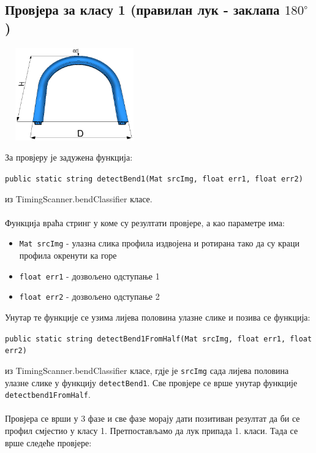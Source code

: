 \documentclass[12pt]{article}
\begin{document}
\subsection{Провјера за класу 1 (правилан лук - заклапа $180^\circ$)}
\vspace{0.5cm}
\begin{center}
    \centering 
    \includegraphics[height=4cm, width=6cm]{images/klasa1.jpg}
\end{center}
\vspace{0.5cm}
За провјеру је задужена функција:
\begin{center}
\texttt{public static string detectBend1(Mat srcImg, float err1, float err2)}
\end{center}
из TimingScanner.bendClassifier класе.\\\\
Функција враћа стринг у коме су резултати провјере, а као параметре има:
\begin{itemize}
    \item \texttt{Mat srcImg} - улазна слика профила издвојена и ротирана тако да су краци профила окренути ка горе 
    \item \texttt{float err1} - дозвољено одступање 1
    \item \texttt{float err2} - дозвољено одступање 2
\end{itemize}
Унутар те функције се узима лијева половина улазне слике и позива се функција:
\begin{center}
\texttt{public static string detectBend1FromHalf(Mat srcImg, float err1, float err2)}
\end{center}
из TimingScanner.bendClassifier класе, гдје је \texttt{srcImg} сада лијева половина улазне слике у функцију \texttt{detectBend1}. Све провјере се врше унутар функције \texttt{detectbend1FromHalf}.\\\\
Провјера се врши у 3 фазе и све фазе морају дати позитиван резултат да би се профил смјестио у класу 1. Претпостављамо да лук припада 1. класи. Тада се врше следеће провјере:\\
\end{document}
